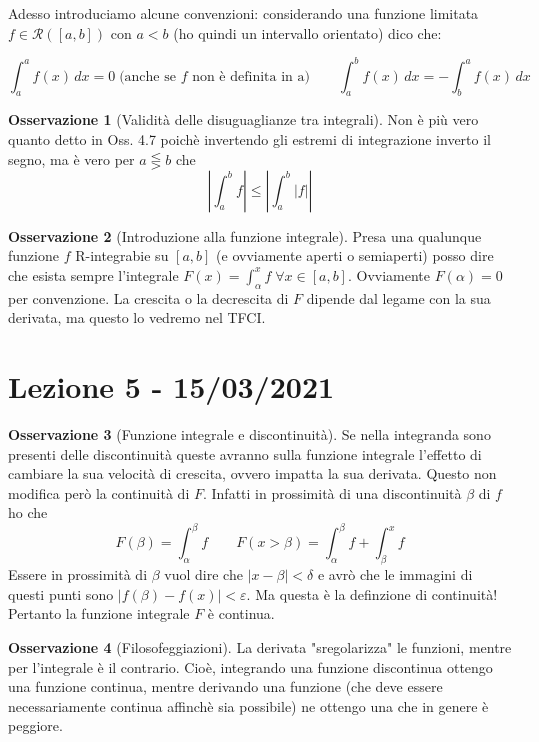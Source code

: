 \documentclass{article}
\theoremstyle{definition}
\theoremstyle{definition}
\theoremstyle{definition}
\theoremstyle{definition}
\newtheorem{remark}{Osservazione}[section]
\theoremstyle{definition}
\begin{document}
Adesso introduciamo alcune convenzioni: considerando una funzione limitata $f\in\mathcal{R}([a,b])$ con $a<b$ (ho quindi un intervallo orientato) dico che:

\[
    \int_a^a f(x) \, dx = 0 \; \text{(anche se $f$ non è definita in a)} \qquad \int_a^b f(x) \, dx = -\int_b^a f(x)\, dx    
\]

\begin{remark}[Validità delle disuguaglianze tra integrali]
    Non è più vero quanto detto in Oss. 4.7 poichè invertendo gli estremi di integrazione inverto il segno, ma è vero per $a \lesseqgtr b$ che 
    \[
        \left|\int_a^b f \right| \leq \left|\int_a^b \left| f \right| \right|
    \]
\end{remark}

\begin{remark}[Introduzione alla funzione integrale]
    Presa una qualunque funzione $f$ R-integrabie su $[a,b]$ (e ovviamente aperti o semiaperti) posso dire che esista sempre l'integrale $\displaystyle{F(x)=\int_\alpha^x f} \; \forall x \in [a,b]$. Ovviamente $F(\alpha)=0$ per convenzione. La crescita o la decrescita di $F$ dipende dal legame con la sua derivata, ma questo lo vedremo nel TFCI.
\end{remark}

\newpage
\section{Lezione 5 - 15/03/2021}

\begin{remark}[Funzione integrale e discontinuità]
    Se nella integranda sono presenti delle discontinuità queste avranno sulla funzione integrale l'effetto di cambiare la sua velocità di crescita, ovvero impatta la sua derivata. Questo non modifica però la continuità di $F$. Infatti in prossimità di una discontinuità $\beta$ di $f$ ho che
    \[
        F(\beta)=\int_\alpha^\beta f \qquad F(x>\beta) = \int_\alpha^\beta f + \int_\beta^x f
    \]
    Essere in prossimità di $\beta$ vuol dire che $\left|x-\beta\right|<\delta$ e avrò che le immagini di questi punti sono $\left|f(\beta)-f(x)\right|<\varepsilon$. Ma questa è la definzione di continuità! Pertanto la funzione integrale $F$ è continua.
\end{remark}

\begin{remark}[Filosofeggiazioni]
    La derivata "sregolarizza" le funzioni, mentre per l'integrale è il contrario. Cioè, integrando una funzione discontinua ottengo una funzione continua, mentre derivando una funzione (che deve essere necessariamente continua affinchè sia possibile) ne ottengo una che in genere è peggiore.
\end{remark}
\end{document}

